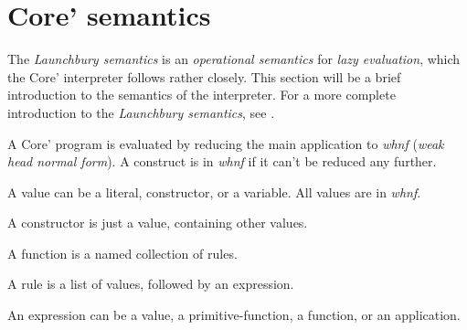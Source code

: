 \section{Core' semantics}

The \emph{Launchbury semantics} is an \emph{operational semantics} for 
\emph{lazy evaluation}, which the Core' interpreter follows rather closely. 
This section will be a brief introduction to the semantics of the interpreter.
For a more complete introduction to 
the \emph{Launchbury semantics}, see \cite{launchbury1993natural}. 

A Core' program is evaluated by reducing the main application to \emph{whnf} 
(\emph{weak head normal form}). A construct is in \emph{whnf} if it can't be
reduced any further.


A value can be a literal, constructor, or a variable. All values are in \emph{whnf}.


A constructor is just a value, containing other values.


A function is a named collection of rules.


A rule is a list of values, followed by an expression.


An expression can be a value, a primitive-function, a function, or an application.


